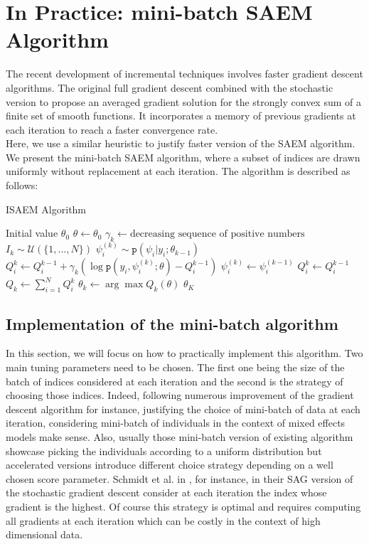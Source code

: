 \documentclass[a4paper]{article}
\theoremstyle{plain}
\newcommand{\dens}{\texttt{p}}
\theoremstyle{plain}
\theoremstyle{definition}
\begin{document}
\section{In Practice: mini-batch SAEM Algorithm}
The recent development of incremental techniques involves faster gradient descent algorithms. The original full gradient descent combined with the stochastic version to propose an averaged gradient solution \citep{bach, roux} for the strongly convex sum of a finite set of smooth functions. It incorporates a memory of previous gradients at each iteration to reach a faster convergence rate.\\
Here, we use a similar heuristic to justify faster version of the SAEM algorithm. We present the mini-batch SAEM algorithm, where a subset of indices are drawn uniformly without replacement at each iteration. The algorithm is described as follows:
\begin{algorithm}[H]
\caption{ISAEM Algorithm}
\label{alg:ISAEM}
\begin{algorithmic}[1]
\State Initial value $\theta_0$
\State $\theta \gets \theta_0$
\State $\gamma_k \gets \text{decreasing sequence of positive numbers}$
  \State $I_k \sim \mathcal{U}(\{1,...,N\})$
    \State $\psi_i^{(k)} \sim \dens(\psi_i|y_i; \theta_{k-1})$
    \State $Q_i^k \gets Q_i^{k-1} + \gamma_k(\log \dens(y_i,\psi_i^{(k)}; \theta) - Q_i^{k-1})$
  \Else
    \State $\psi_i^{(k)} \gets \psi_i^{(k-1)}$
    \State $Q_i^k \gets Q_i^{k-1}$
  \EndIf
    \State $Q_k \gets \sum_{i=1}^{N}{Q_i^k}$
    \State $\theta_k \gets \arg \max Q_k(\theta)$
\EndFor  
\State \Return $\theta_K$
\end{algorithmic}
\end{algorithm}


\subsection{Implementation of the mini-batch algorithm}
In this section, we will focus on how to practically implement this algorithm. Two main tuning parameters need to be chosen. The first one being the size of the batch of indices considered at each iteration and the second is the strategy of choosing those indices. Indeed, following numerous improvement of the gradient descent algorithm for instance, justifying the choice of mini-batch of data at each iteration, considering mini-batch of individuals in the context of mixed effects models make sense. Also, usually those mini-batch version of existing algorithm showcase picking the individuals according to a uniform distribution but accelerated versions introduce different choice strategy depending on a well chosen score parameter. Schmidt et al. in \citep{roux}, for instance, in their SAG version of the stochastic gradient descent consider at each iteration the index whose gradient is the highest. Of course this strategy is optimal and requires computing all gradients at each iteration which can be costly in the context of high dimensional data.
\end{document}

